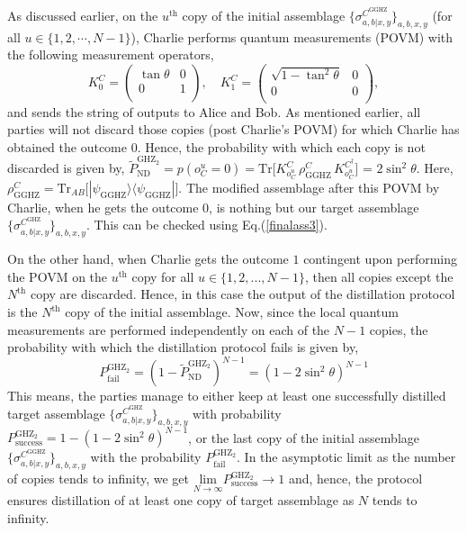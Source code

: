 \documentclass[reprint,superscriptaddress,nofootinbib,amsmath,amssymb,aps,pra,longbibliography]{revtex4-1}
\begin{document}
As discussed earlier, on the $u^{\text{th}}$ copy of the initial assemblage $\{\sigma_{a,b|x,y}^{C^{\text{GGHZ}}}\}_{a,b,x,y}$ (for all $u \in \{1, 2, \cdots, N-1\}$), Charlie performs quantum measurements (POVM) with the following measurement operators,
\begin{equation}
	K_0^{C} = \left(
\begin{array}{cc}
 \tan \theta  & 0 \\
 0 & 1 \\
\end{array}
\right), \quad K_{1}^{C} =  \left(
\begin{array}{cc}
 \sqrt{1 - \tan^2 \theta} & 0 \\
 0 & 0 \\
\end{array}
\right),
\label{GHZ2Ssteer2}
\end{equation}
 and sends the string of outputs to Alice and Bob.  As mentioned earlier, all parties will not discard those copies (post Charlie's POVM) for which Charlie has obtained the outcome $0$. Hence, the probability with which each copy is not discarded is given by, $\tilde{P}^{\text{GHZ}_2}_{\text{ND}} = p(o_C^u = 0) = \text{Tr} \Big[  K_{o^u_C}^C \, \rho_{\text{GGHZ}}^{C} \, K_{o^u_C}^{C^{\dagger}} \Big]$ = $2\sin^2\theta$. Here, $\rho_{\text{GGHZ}}^C = \text{Tr}_{AB}\Big[ |\psi_{\text{GGHZ}} \rangle \langle \psi_{\text{GGHZ}}|\Big]$. The modified assemblage after this POVM by Charlie, when he gets the outcome $0$, is nothing but our target assemblage  $\{ \sigma_{a,b|x,y}^{C^{\text{GHZ}}} \}_{a,b,x,y}$. This can be checked using Eq.(\ref{finalass3}).
 
On the other hand, when Charlie gets the outcome $1$ contingent upon performing the POVM on the $u^{\text{th}}$ copy for all $u \in \{ 1, 2, ..., N-1\}$, then all copies except the $N^{\text{th}}$ copy are discarded. Hence, in this case the output of the distillation protocol is the $N^{\text{th}}$ copy of the initial assemblage. Now, since the local quantum measurements are performed independently on each of the $N-1$ copies, the probability with which the distillation protocol fails is given by,
\begin{equation}
    P^{\text{GHZ}_2}_{\text{fail}} = (1 - \tilde{P}^{\text{GHZ}_2}_{\text{ND}})^{N-1} = (1 - 2\sin^2\theta)^{N-1}
\end{equation}
This means, the parties manage to either keep at least one successfully distilled target assemblage  $\{ \sigma_{a,b|x,y}^{C^{\text{GHZ}}} \}_{a,b,x,y}$ with probability $P^{\text{GHZ}_2}_{\text{success}} = 1 - (1-2\sin^2\theta)^{N-1}$, or the last copy of the initial assemblage $\{\sigma_{a,b|x,y}^{C^{\text{GGHZ}}}\}_{a,b,x,y}$  with the probability $P^{\text{GHZ}_2}_{\text{fail}}$.
In the asymptotic limit as the number of copies tends to infinity, we get $\underset{N \rightarrow \infty}{\text{lim}} P^{\text{GHZ}_2}_{\text{success}} \rightarrow 1$ and, hence, the protocol ensures distillation of at least one copy of target assemblage as $N$ tends to infinity.
\end{document}
